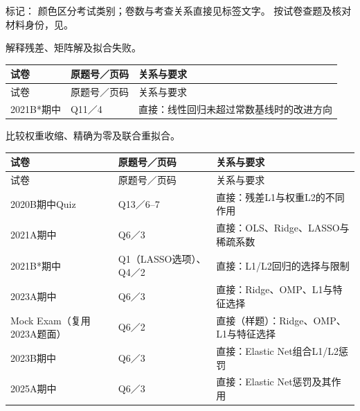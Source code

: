 标记：   颜色区分考试类别；卷数与考查关系直接见标签文字。
按试卷查题及核对材料身份，见。



解释残差、矩阵解及拟合失败。

\begingroup\small\setlength{\tabcolsep}{3pt}\renewcommand{\arraystretch}{1.22}
\begin{longtable}{@{}>{\raggedright\arraybackslash}p{}>{\raggedright\arraybackslash}p{}>{\raggedright\arraybackslash}p{}@{}}
\toprule
试卷 & 原题号／页码 & 关系与要求 \\
\midrule\endfirsthead
试卷 & 原题号／页码 & 关系与要求 \\
\midrule\endhead
\bottomrule\endfoot
2021B*期中 & Q11／4 & 直接：线性回归未超过常数基线时的改进方向 \\
\end{longtable}\endgroup



比较权重收缩、精确为零及联合重拟合。

\begingroup\small\setlength{\tabcolsep}{3pt}\renewcommand{\arraystretch}{1.22}
\begin{longtable}{@{}>{\raggedright\arraybackslash}p{}>{\raggedright\arraybackslash}p{}>{\raggedright\arraybackslash}p{}@{}}
\toprule
试卷 & 原题号／页码 & 关系与要求 \\
\midrule\endfirsthead
试卷 & 原题号／页码 & 关系与要求 \\
\midrule\endhead
\bottomrule\endfoot
2020B期中Quiz & Q13／6–7 & 直接：残差L1与权重L2的不同作用 \\
2021A期中 & Q6／3 & 直接：OLS、Ridge、LASSO与稀疏系数 \\
2021B*期中 & Q1（LASSO选项）、Q4／2 & 直接：L1/L2回归的选择与限制 \\
2023A期中 & Q6／3 & 直接：Ridge、OMP、L1与特征选择 \\
Mock Exam（复用2023A题面） & Q6／2 & 直接（样题）：Ridge、OMP、L1与特征选择 \\
2023B期中 & Q6／3 & 直接：Elastic Net组合L1/L2惩罚 \\
2025A期中 & Q6／3 & 直接：Elastic Net惩罚及其作用 \\
\end{longtable}\endgroup

